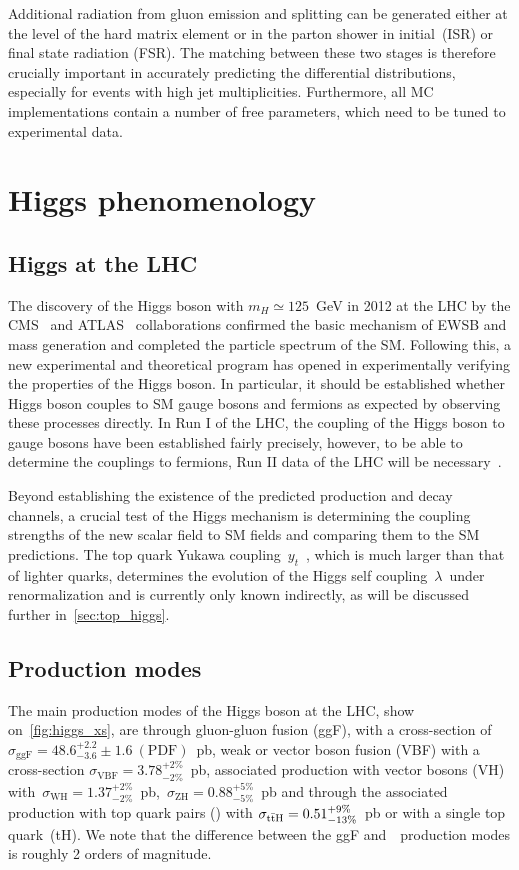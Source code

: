 Additional radiation from gluon emission and splitting can be generated either at the level of the hard matrix element or in the parton shower in initial (ISR) or final state radiation (FSR). The matching between these two stages is therefore crucially important in accurately predicting the differential distributions, especially for events with high jet multiplicities. Furthermore, all MC implementations contain a number of free parameters, which need to be tuned to experimental data.


\section{Higgs phenomenology}
\subsection{Higgs at the LHC}
The discovery of the Higgs boson with $m_H \simeq 125$~GeV in 2012 at the LHC by the CMS~\cite{Chatrchyan:2012xdj} and ATLAS~\cite{Aad:2012tfa} collaborations confirmed the basic mechanism of EWSB and mass generation and completed the particle spectrum of the SM. Following this, a new experimental and theoretical program has opened in experimentally verifying the properties of the Higgs boson. In particular, it should be established whether Higgs boson couples to SM gauge bosons and fermions as expected by observing these processes directly. In Run I of the LHC, the coupling of the Higgs boson to gauge bosons have been established fairly precisely, however, to be able to determine the couplings to fermions, Run II data of the LHC will be necessary~\cite{Khachatryan:2016vau}.

Beyond establishing the existence of the predicted production and decay channels, a crucial test of the Higgs mechanism is determining the coupling strengths of the new scalar field to SM fields and comparing them to the SM predictions. The top quark Yukawa coupling~$y_t$~, which is much larger than that of lighter quarks, determines the evolution of the Higgs self coupling~$\lambda$~under renormalization and is currently only known indirectly, as will be discussed further in~\cref{sec:top_higgs}.

\subsection{Production modes}
The main production modes of the Higgs boson at the LHC, show on~\cref{fig:higgs_xs}, are through gluon-gluon fusion (ggF), with a cross-section of~$\sigma_{\mathrm{ggF}} = 48.6^{+2.2}_{-3.6}\pm1.6~(\mathrm{PDF})$~pb, weak or vector boson fusion (VBF) with a cross-section $\sigma_{\mathrm{VBF}} = 3.78^{+2\%}_{-2\%}$~pb, associated production with vector bosons (VH) with~$\sigma_{\mathrm{WH}} = 1.37^{+2\%}_{-2\%}$~pb,~$\sigma_{\mathrm{ZH}} = 0.88^{+5\%}_{-5\%}$~pb and through the associated production with top quark pairs (\ttH) with $\sigma_{\mathrm{t} \bar{\mathrm{t}} \mathrm{H}} = 0.51^{+9\%}_{-13\%}$~pb or with a single top quark~(tH). We note that the difference between the ggF and~\ttH~production modes is roughly 2 orders of magnitude.

